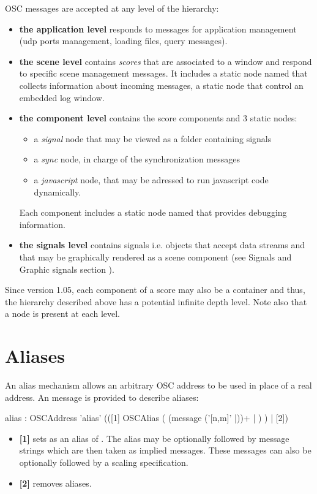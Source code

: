\documentclass[a4paper,twoside]{report}
\newcommand{\sublevel}[1]	{\section{#1}}
\begin{document}
OSC messages are accepted at any level of the hierarchy:
\begin{itemize}

\item \textbf{the application level} responds to messages for application management (udp ports management, loading files, query messages). \\

\item \textbf{the scene level} contains \emph{scores} that are associated to a window and respond to specific scene management messages. 
It includes a static node named  that collects information about incoming messages, a static  node that control an embedded log window.


\item \textbf{the component level} contains the score components and 3 static nodes:
\begin{itemize}
\item a \emph{signal} node that may be viewed as a folder containing signals
\item a \emph{sync} node, in charge of the synchronization messages
\item a \emph{javascript} node, that may be adressed to run javascript code dynamically.
\end{itemize}

Each component includes a static node named  that provides debugging information.
\item \textbf{the signals level} contains signals i.e. objects that accept data streams and that may be graphically rendered as a scene component (see Signals and Graphic signals section ).

\end{itemize}

\note{} Since version 1.05, each component of a score may also be a container and thus, the hierarchy described above has a potential infinite depth level. Note also that a  node is present at each level. 


\sublevel{Aliases}
\label{alias}
An alias mechanism allows an arbitrary OSC address to be used in place of a real address. An  message is provided to describe aliases: 


\begin{rail}
alias : OSCAddress 'alias' (([1] OSCAlias ( (message ('[n,m]' |))+ | ) ) | [2])
\end{rail}
\begin{itemize}
\item \textbf{[1]} sets  as an alias of . The alias may be optionally followed by message strings which are then taken as implied messages. These messages can also be optionally followed by a scaling specification.
\item \textbf{[2]} removes  aliases.
\end{itemize}
\end{document}
